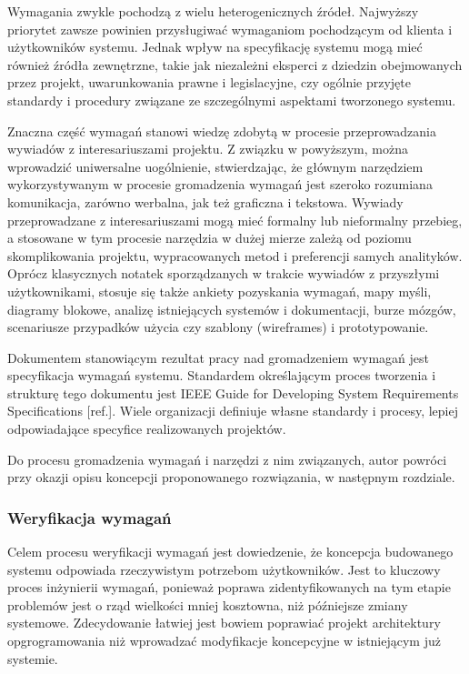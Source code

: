         Wymagania zwykle pochodzą z wielu heterogenicznych źródeł. Najwyższy priorytet zawsze powinien przysługiwać wymaganiom pochodzącym od klienta i użytkowników systemu. Jednak wpływ na specyfikację systemu mogą mieć również źródła zewnętrzne, takie jak niezależni eksperci z dziedzin obejmowanych przez projekt, uwarunkowania prawne i legislacyjne, czy ogólnie przyjęte standardy i procedury związane ze szczególnymi aspektami tworzonego systemu.

        Znaczna część wymagań stanowi wiedzę zdobytą w procesie przeprowadzania wywiadów z interesariuszami projektu. Z związku w powyższym, można wprowadzić uniwersalne uogólnienie, stwierdzając, że głównym narzędziem wykorzystywanym w procesie gromadzenia wymagań jest szeroko rozumiana komunikacja, zarówno werbalna, jak też graficzna i tekstowa. Wywiady przeprowadzane z interesariuszami mogą mieć formalny lub nieformalny przebieg, a stosowane w tym procesie narzędzia w dużej mierze zależą od poziomu skomplikowania projektu, wypracowanych metod i preferencji samych analityków. Oprócz klasycznych notatek sporządzanych w trakcie wywiadów z przyszłymi użytkownikami, stosuje się także ankiety pozyskania wymagań, mapy myśli, diagramy blokowe, analizę istniejących systemów i dokumentacji, burze mózgów, scenariusze przypadków użycia czy szablony (wireframes) i prototypowanie. 

        Dokumentem stanowiącym rezultat pracy nad gromadzeniem wymagań jest specyfikacja wymagań systemu. Standardem określającym proces tworzenia i strukturę tego dokumentu jest IEEE Guide for Developing System Requirements Specifications [ref.]. Wiele organizacji definiuje własne standardy i procesy, lepiej odpowiadające specyfice realizowanych projektów.

        Do procesu gromadzenia wymagań i narzędzi z nim związanych, autor powróci przy okazji opisu koncepcji proponowanego rozwiązania, w następnym rozdziale.

      \subsubsection{Weryfikacja wymagań}

        Celem procesu weryfikacji wymagań jest dowiedzenie, że koncepcja budowanego systemu odpowiada rzeczywistym potrzebom użytkowników. Jest to kluczowy proces inżynierii wymagań, ponieważ poprawa zidentyfikowanych na tym etapie problemów jest o rząd wielkości mniej kosztowna, niż późniejsze zmiany systemowe. Zdecydowanie łatwiej jest bowiem poprawiać projekt architektury opgrogramowania niż wprowadzać modyfikacje koncepcyjne w istniejącym już systemie. 

